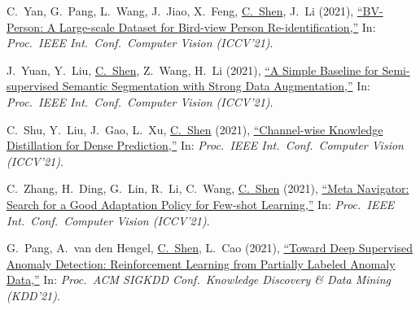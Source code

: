 \documentclass[9pt, a4paper]{article}
\newcommand{\years}[1]{\marginnote{\scriptsize #1}}
\def\highlight{\uline}
\begin{document}
\medskip

\years{2021} C.~Yan, G.~Pang, L.~Wang, J.~Jiao, X.~Feng, \highlight{C.~Shen}, J.~Li (2021),
\href{http://www.google.com/search?lr=&ie=UTF-8&oe=UTF-8&q=BV-Person%3A+A+Large-scale+Dataset+for+Bird-view+Person+Re-identification+Cheng+Yan%2C+Guansong+Pang%2C+Lei+Wang%2C+Jile+Jiao%2C+Xuetao+Feng%2C+Chunhua+Shen%2C+Jingjing+Li}{``{BV-Person}: A Large-scale Dataset for Bird-view Person Re-identification,{}''}
In: \emph{Proc.\ IEEE Int.\ Conf.\  Computer Vision (ICCV'21)}.

\medskip

\years{2021} J.~Yuan, Y.~Liu, \highlight{C.~Shen}, Z.~Wang, H.~Li (2021),
\href{http://www.google.com/search?lr=&ie=UTF-8&oe=UTF-8&q=A+Simple+Baseline+for+Semi-supervised+Semantic+Segmentation+with+Strong+Data+Augmentation+Jianlong+Yuan%2C+Yifan+Liu%2C+Chunhua+Shen%2C+Zhibin+Wang%2C+Hao+Li}{``A Simple Baseline for Semi-supervised Semantic Segmentation with Strong Data Augmentation,{}''}
In: \emph{Proc.\ IEEE Int.\ Conf.\  Computer Vision (ICCV'21)}.

\medskip

\years{2021} C.~Shu, Y.~Liu, J.~Gao, L.~Xu, \highlight{C.~Shen} (2021),
\href{http://www.google.com/search?lr=&ie=UTF-8&oe=UTF-8&q=Channel-wise+Knowledge+Distillation+for+Dense+Prediction+Changyong+Shu%2C+Yifan+Liu%2C+Jianfei+Gao%2C+Lin+Xu%2C+Chunhua+Shen}{``Channel-wise Knowledge Distillation for Dense Prediction,{}''}
In: \emph{Proc.\ IEEE Int.\ Conf.\  Computer Vision (ICCV'21)}.

\medskip

\years{2021} C.~Zhang, H.~Ding, G.~Lin, R.~Li, C.~Wang, \highlight{C.~Shen} (2021),
\href{http://www.google.com/search?lr=&ie=UTF-8&oe=UTF-8&q=Meta+Navigator%3A+Search+for+a+Good+Adaptation+Policy+for+Few-shot+Learning+Chi+Zhang%2C+Henghui+Ding%2C+Guosheng+Lin%2C+Ruibo+Li%2C+Changhu+Wang%2C+Chunhua+Shen}{``Meta Navigator: Search for a Good Adaptation Policy for Few-shot Learning,{}''}
In: \emph{Proc.\ IEEE Int.\ Conf.\  Computer Vision (ICCV'21)}.

\medskip

\years{2021} G.~Pang, A.~van den Hengel, \highlight{C.~Shen}, L.~Cao (2021),
\href{http://www.google.com/search?lr=&ie=UTF-8&oe=UTF-8&q=Toward+Deep+Supervised+Anomaly+Detection%3A+Reinforcement+Learning+from+Partially+Labeled+Anomaly+Data+Guansong+Pang%2C+Anton+van+den+Hengel%2C+Chunhua+Shen%2C+Longbing+Cao}{``Toward Deep Supervised Anomaly Detection: Reinforcement Learning from Partially Labeled Anomaly Data,{}''}
In: \emph{Proc.\ ACM SIGKDD Conf.\  Knowledge Discovery \& Data Mining (KDD'21)}.
\end{document}
